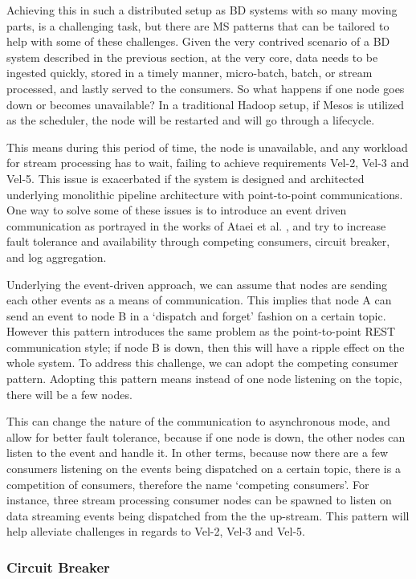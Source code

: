 \documentclass{bmcart}
\begin{document}
Achieving this in such a distributed setup as BD systems with so many moving parts, is a challenging task, but there are MS patterns that can be tailored to help with some of these challenges. Given the very contrived scenario of a BD system described in the previous section, at the very core, data needs to be ingested quickly, stored in a timely manner, micro-batch, batch, or stream processed, and lastly served to the consumers. So what happens if one node goes down or becomes unavailable? In a traditional Hadoop setup, if Mesos is utilized as the scheduler, the node will be restarted and will go through a lifecycle. 

This means during this period of time, the node is unavailable, and any workload for stream processing has to wait, failing to achieve requirements Vel-2, Vel-3 and Vel-5. This issue is exacerbated if the system is designed and architected underlying monolithic pipeline architecture with point-to-point communications. One way to solve some of these issues is to introduce an event driven communication as portrayed in the works of Ataei et al. \cite{ataei2021neomycelia}, and try to increase fault tolerance and availability through competing consumers, circuit breaker, and log aggregation. 

Underlying the event-driven approach, we can assume that nodes are sending each other events as a means of communication. This implies that node A can send an event to node B in a `dispatch and forget' fashion on a certain topic. However this pattern introduces the same problem as the point-to-point REST communication style; if node B is down, then this will have a ripple effect on the whole system. To address this challenge, we can adopt the competing consumer pattern. Adopting this pattern means instead of one node listening on the topic, there will be a few nodes. 

This can change the nature of the communication to asynchronous mode, and allow for better fault tolerance, because if one node is down, the other nodes can listen to the event and handle it. In other terms, because now there are a few consumers listening on the events being dispatched on a certain topic, there is a competition of consumers, therefore the name `competing consumers'. For instance, three stream processing consumer nodes can be spawned to listen on data streaming events being dispatched from the the up-stream. This pattern will help alleviate challenges in regards to Vel-2, Vel-3 and Vel-5.

\subsubsection{Circuit Breaker}
\end{document}
